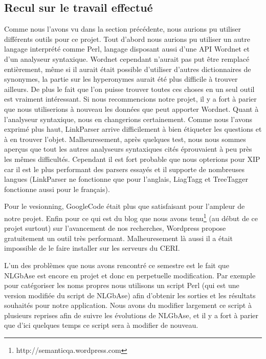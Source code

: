 \documentclass[10pt,a4paper]{article}
\begin{document}
\subsection{Recul sur le travail effectué}
\par Comme nous l'avons vu dans la section précédente, nous aurions pu utiliser différents outils pour ce projet. Tout d'abord nous aurions pu utiliser un autre langage interprété comme Perl, langage disposant aussi d'une API Wordnet et d'un analyseur syntaxique. Wordnet cependant n'aurait pas put être remplacé entièrement, même si il aurait était possible d'utiliser d'autres dictionnaires de synonymes, la partie sur les hyperonymes aurait été plus difficile à trouver ailleurs. De plus le fait que l'on puisse trouver toutes ces choses en un seul outil est vraiment intéressant. Si nous recommencions notre projet, il y a fort à parier que nous utiliserions à nouveau les données que peut apporter Wordnet. Quant à l'analyseur syntaxique, nous en changerions certainement. Comme nous l'avons exprimé plus haut, LinkParser arrive difficilement à bien étiqueter les questions et à en trouver l'objet. Malheuresement, après quelques test, nous nous sommes aperçus que tout les autres analyseurs syntaxiques cités éprouvaient à peu près les mêmes difficultés. Cependant il est fort probable que nous opterions pour XIP car il est le plus performant des parsers essayés et il supporte de nombreuses langues (LinkParser ne fonctionne que pour l'anglais, LiagTagg et TreeTagger fonctionne aussi pour le français).
\par Pour le vesionning, GoogleCode était plus que satisfaisant pour l'ampleur de notre projet. Enfin pour ce qui est du blog que nous avons tenu\footnote{http://semanticqa.wordpress.com} (au début de ce projet surtout) sur l'avancement de nos recherches, Wordpress propose gratuitement un outil très performant. Malheuresement là aussi il a était impossible de le faire installer sur les serveurs du CERI.
\par L'un des problèmes que nous avons rencontré ce semestre est le fait que NLGbAse est encore en projet et donc en perpetuelle modification. Par exemple pour catégoriser les noms propres nous utilisons un script Perl (qui est une version modifiée du script de NLGbAse) afin d'obtenir les sorties et les résultats souhaités pour notre application. Nous avons du modifier largement ce script à plusieurs reprises afin de suivre les évolutions de NLGbAse, et il y a fort à parier que d'ici quelques temps ce script sera à modifier de nouveau. 
\end{document}
